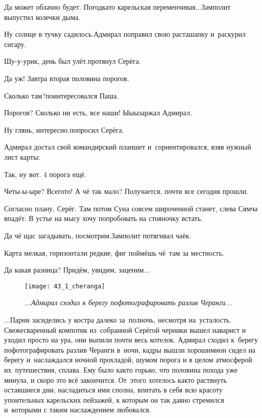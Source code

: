 \diagdash Да может облачно будет. Погодка\sdash то карельская переменчивая$\ldots$\mdash Замполит выпустил колечки дыма.

\diagdash Ну солнце в тучку садилось.\mdash Адмирал поправил свою раста\sdash шапку и~раскурил сигару. 

\diagdash Шу-у-урик, день был улёт.\mdash протянул Серёга.

\diagdash Да уж! Завтра вторая половина порогов.

\diagdash Сколько там?\mdash поинтересовался Паша.

\diagdash Порогов? Сколько ни есть, все наши! Ы\sdash ы\sdash ы\mdash заржал Адмирал.

\diagdash Ну глянь, интересно.\mdash попросил Серёга.

Адмирал достал свой командирский планшет и~сориентировался, взяв нужный лист карты:

\diagdash Так, ну вот. 4 порога ещё.

\diagdash Четы-ы-ыре? Всего\sdash то! А чё так мало? Получается, почти все сегодня прошли.

\diagdash Согласно плану, Серёг. Там потом Суна совсем широченной станет, слева Сямча впадёт. В устье на мысу хочу попробовать на стояночку встать.

\diagdash Да чё щас загадывать, посмотрим.\mdash Замполит потягивал чаёк.

\diagdash Карта мелкая, горизонтали редкие, фиг поймёшь чё~там за местность.

\diagdash Да какая разница? Придём, увидим, заценим$\ldots$


\setlength{\belowcaptionskip}{1.0mm}

\begin{figure}[h]
	\centering
	\texttt{[image: 43\_1\_cheranga]}
	\caption{\small\textit{...Адмирал сходил к берегу пофотографировать разлив Черанги...}}
\end{figure}


$\ldots$Парни засиделись у костра далеко за~полночь, несмотря на~усталость. Свежесваренный компотик из~собранной Серёгой черники вышел наварист и уходил просто на ура, они выпили почти весь котелок. Адмирал сходил к~берегу пофотографировать разлив Черанги в~ночи, 
кадры вышли хорошими\mdash он сидел на берегу и~наслаждался ночной прохладой, шумом порога и в целом атмосферой их~путешествия, сплава. Ему было как\sdash то горько, что половина похода уже минула, и скоро это всё закончится. От~этого хотелось как\sdash то растянуть оставшиеся дни, насладиться ими сполна, впитать в себя всю красоту упоительных карельских пейзажей, к которым он так давно стремился и~которыми с таким наслаждением любовался.


\begin{center}
\end{center}
